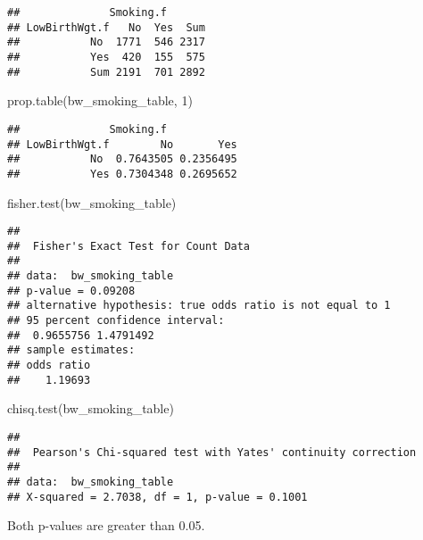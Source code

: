 \documentclass[
]{article}
\newenvironment{Shaded}{\begin{snugshade}}{\end{snugshade}}
\newcommand{\AttributeTok}[1]{\textcolor[rgb]{0.77,0.63,0.00}{#1}}
\newcommand{\ConstantTok}[1]{\textcolor[rgb]{0.00,0.00,0.00}{#1}}
\newcommand{\DecValTok}[1]{\textcolor[rgb]{0.00,0.00,0.81}{#1}}
\newcommand{\FunctionTok}[1]{\textcolor[rgb]{0.00,0.00,0.00}{#1}}
\newcommand{\NormalTok}[1]{#1}
\newcommand{\OtherTok}[1]{\textcolor[rgb]{0.56,0.35,0.01}{#1}}
\newcommand{\SpecialCharTok}[1]{\textcolor[rgb]{0.00,0.00,0.00}{#1}}
\newcommand{\StringTok}[1]{\textcolor[rgb]{0.31,0.60,0.02}{#1}}
\begin{document}
\begin{verbatim}
##              Smoking.f
## LowBirthWgt.f   No  Yes  Sum
##           No  1771  546 2317
##           Yes  420  155  575
##           Sum 2191  701 2892
\end{verbatim}

\begin{Shaded}
\begin{Highlighting}[]
\FunctionTok{prop.table}\NormalTok{(bw\_smoking\_table, }\DecValTok{1}\NormalTok{)}
\end{Highlighting}
\end{Shaded}

\begin{verbatim}
##              Smoking.f
## LowBirthWgt.f        No       Yes
##           No  0.7643505 0.2356495
##           Yes 0.7304348 0.2695652
\end{verbatim}

\begin{Shaded}
\begin{Highlighting}[]
\FunctionTok{fisher.test}\NormalTok{(bw\_smoking\_table)}
\end{Highlighting}
\end{Shaded}

\begin{verbatim}
## 
##  Fisher's Exact Test for Count Data
## 
## data:  bw_smoking_table
## p-value = 0.09208
## alternative hypothesis: true odds ratio is not equal to 1
## 95 percent confidence interval:
##  0.9655756 1.4791492
## sample estimates:
## odds ratio 
##    1.19693
\end{verbatim}

\begin{Shaded}
\begin{Highlighting}[]
\FunctionTok{chisq.test}\NormalTok{(bw\_smoking\_table)}
\end{Highlighting}
\end{Shaded}

\begin{verbatim}
## 
##  Pearson's Chi-squared test with Yates' continuity correction
## 
## data:  bw_smoking_table
## X-squared = 2.7038, df = 1, p-value = 0.1001
\end{verbatim}

Both p-values are greater than 0.05.

\begin{Shaded}
\end{Shaded}
\end{document}
